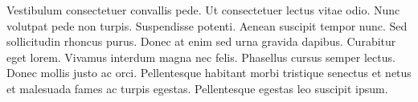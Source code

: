 Vestibulum consectetuer convallis pede. Ut consectetuer lectus
vitae odio. Nunc volutpat pede non turpis. Suspendisse potenti.
Aenean suscipit tempor nunc. Sed sollicitudin rhoncus purus.
Donec at enim sed urna gravida dapibus. Curabitur eget lorem.
Vivamus interdum magna nec felis. Phasellus cursus semper lectus.
Donec mollis justo ac orci. Pellentesque habitant morbi tristique
senectus et netus et malesuada fames ac turpis egestas.
Pellentesque egestas leo suscipit ipsum.
